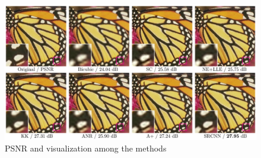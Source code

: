 \documentclass[10pt]{article}
\begin{document}
\begin{figure}[H]
	\centering
	\includegraphics[scale=0.4]{figs/comparePSNR.PNG}
	\caption{PSNR and visualization among the methods}
	\label{fig:5}
\end{figure}




\end{document}
